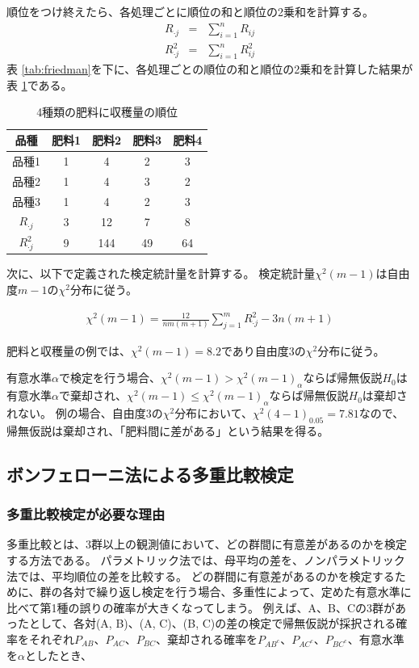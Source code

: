 \documentclass[titlepage,12pt]{jreport}
\newcommand{\wa}{\cdot}
\begin{document}
順位をつけ終えたら、各処理ごとに順位の和と順位の2乗和を計算する。
\begin{eqnarray}
	R_{\wa j} &=& \sum_{i = 1}^{n}R_{ij} \\
	R^{2}_{\wa j} &=& \sum_{i = 1}^{n}R^{2}_{ij}
\end{eqnarray}
表 \ref{tab:friedman}を下に、各処理ごとの順位の和と順位の2乗和を計算した結果が表 \ref{tab:friedman_junni}である。
\begin{table}[tbp]
	\begin{center}
		\caption{4種類の肥料に収穫量の順位}
		\begin{tabular}{|c||c|c|c|c|} \hline
			品種 & 肥料1 & 肥料2 & 肥料3 & 肥料4  \\ \hline \hline
			品種1 & 1 & 4 & 2 & 3 \\ \hline
			品種2 & 1 & 4 & 3 & 2 \\ \hline
			品種3 & 1 & 4 & 2 & 3 \\ \hline 
			$R_{\wa j}$ & 3 & 12 & 7 & 8\\ \hline
			$R^{2}_{\wa j}$ & 9 & 144 & 49 & 64\\ \hline
		\end{tabular}
		\label{tab:friedman_junni}
	\end{center}
\end{table}

次に、以下で定義された検定統計量を計算する。 検定統計量$\chi^{2}(m - 1)$は自由度$m - 1$の$\chi^{2}$分布に従う。

\begin{eqnarray}
	\chi^{2}(m - 1) = \frac{12}{nm(m + 1)}\sum_{j = 1}^{m}R^{2}_{\wa j} - 3n(m + 1)
\end{eqnarray}

肥料と収穫量の例では、$\chi^{2}(m - 1) = 8.2$であり自由度3の$\chi^{2}$分布に従う。

有意水準$\alpha$で検定を行う場合、$\chi^{2}(m - 1) > \chi^{2}(m - 1)_{\alpha}$ならば帰無仮説$H_{0}$は有意水準$\alpha$で棄却され、$\chi^{2}(m - 1) \leq \chi^{2}(m - 1)_{\alpha}$ならば帰無仮説$H_{0}$は棄却されない。 例の場合、自由度3の$\chi^{2}$分布において、$\chi^{2}(4 - 1)_{0.05} = 7.81$なので、帰無仮説は棄却され、「肥料間に差がある」という結果を得る。

\subsection{ボンフェローニ法による多重比較検定\label{sub:tajuu}}
\subsubsection{多重比較検定が必要な理由}
	多重比較とは、3群以上の観測値において、どの群間に有意差があるのかを検定する方法である。 パラメトリック法では、母平均の差を、ノンパラメトリック法では、平均順位の差を比較する。 どの群間に有意差があるのかを検定するために、群の各対で繰り返し検定を行う場合、多重性によって、定めた有意水準に比べて第1種の誤りの確率が大きくなってしまう。 例えば、A、B、Cの3群があったとして、各対(A, B)、(A, C)、(B, C)の差の検定で帰無仮説が採択される確率をそれぞれ$P_{AB}$、$P_{AC}$、$P_{BC}$、棄却される確率を$P_{AB^{c}}$、$P_{AC^{c}}$、$P_{BC^{c}}$、有意水準を$\alpha$としたとき、
\end{document}
